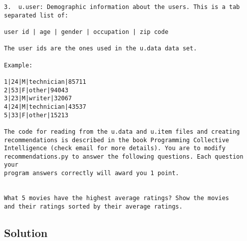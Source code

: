 \begin{verbatim}
3.  u.user: Demographic information about the users. This is a tab
separated list of:

user id | age | gender | occupation | zip code

The user ids are the ones used in the u.data data set.

Example:

1|24|M|technician|85711 
2|53|F|other|94043 
3|23|M|writer|32067 
4|24|M|technician|43537 
5|33|F|other|15213

The code for reading from the u.data and u.item files and creating
recommendations is described in the book Programming Collective
Intelligence (check email for more details). You are to modify
recommendations.py to answer the following questions. Each question your
program answers correctly will award you 1 point.


What 5 movies have the highest average ratings? Show the movies
and their ratings sorted by their average ratings.
\end{verbatim}
\subsection{Solution}

